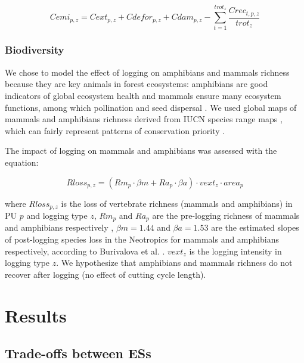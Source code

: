 \documentclass{article}
\begin{document}
\begin{equation}
\label{eq:cemi}
    Cemi_{p,z} = Cext_{p,z} + Cdefor_{p,z} + Cdam_{p,z} -  \sum_{t=1}^{trot_z} \frac{Crec_{t,p,z}}{trot_z} 
\end{equation}


\subsubsection{Biodiversity}

We chose to model the effect of logging on amphibians and mammals richness because they are key animals in forest ecosystems: amphibians are good indicators of global ecosystem health \cite{Welsh1998,Collins2003} and mammals ensure many ecosystem functions, among which pollination \cite{Fleming2009} and seed dispersal \cite{Wright2000,Muscarella2007}. We used global maps of mammals and amphibians richness derived from IUCN species range maps \cite{Jenkins2013,MapBiodiv}, which can fairly represent patterns of conservation priority \cite{Marechaux2017}.

The impact of logging on mammals and amphibians was assessed with the equation: 

\begin{equation}
\label{eq:rloss}
Rloss_{p,z} = \left(Rm_{p} \cdot \beta m + Ra_{p} \cdot \beta a  \right)  \cdot vext_z \cdot area_p 
\end{equation}

where $Rloss_{p,z}$ is the loss of vertebrate richness (mammals and amphibians) in PU $p$ and logging type $z$, $Rm_{p}$ and $Ra_p$ are the pre-logging richness of mammals and amphibians respectively \cite{Jenkins2013}, $\beta m = 1.44$ and $\beta a = 1.53$  are the estimated slopes of post-logging species loss in the Neotropics for mammals and amphibians respectively, according to Burivalova et al.  \cite{Burivalova2014}. $vext_z$ is the logging intensity in logging type $z$.
We hypothesize that amphibians and mammals richness do not recover after logging (no effect of cutting cycle length). 


\section{Results}

\subsection{Trade-offs between ESs}
\end{document}
